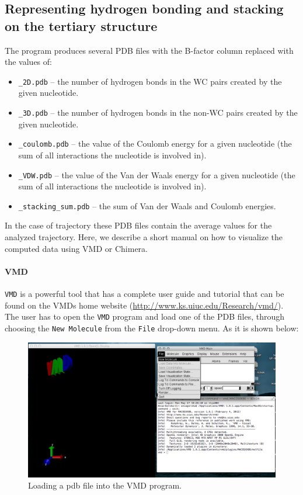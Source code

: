 \documentclass[12pt]{article}
\begin{document}
\subsection{Representing hydrogen bonding and stacking on the tertiary structure} The program produces several PDB files with the B-factor column replaced with the values of:
\begin{itemize}
\item \texttt{\_2D.pdb} -- the number of hydrogen bonds in the WC pairs created by the given nucleotide.
\item \texttt{\_3D.pdb} -- the number of hydrogen bonds in the non-WC pairs created by the given nucleotide.
\item \texttt{\_coulomb.pdb} -- the value of the Coulomb energy for a given nucleotide  (the sum of all interactions the nucleotide is involved in).
\item \texttt{\_VDW.pdb} -- the value of the Van der Waals energy for a given nucleotide (the sum of all interactions the nucleotide is involved in).
\item \texttt{\_stacking\_sum.pdb} -- the sum of Van der Waals and Coulomb energies. 
\end{itemize}

In the case of trajectory these PDB files contain the average values for the analyzed trajectory. Here, we describe a short manual on how to visualize the computed data using VMD or Chimera.

\paragraph{VMD}
\texttt{VMD} is a powerful tool that has a complete user guide and tutorial that can be found on the VMDs home website (\url{http://www.ks.uiuc.edu/Research/vmd/}).
The user has to open the \texttt{VMD} program and load one of the PDB files, through choosing the \texttt{New Molecule} from the \texttt{File} drop-down menu. As it is shown below:

\begin{figure}[h!]
\centering
\includegraphics[scale=0.4]{./pictures/vmd1.png}
\caption{Loading a pdb file into the VMD program.}
\end{figure}
\end{document}
